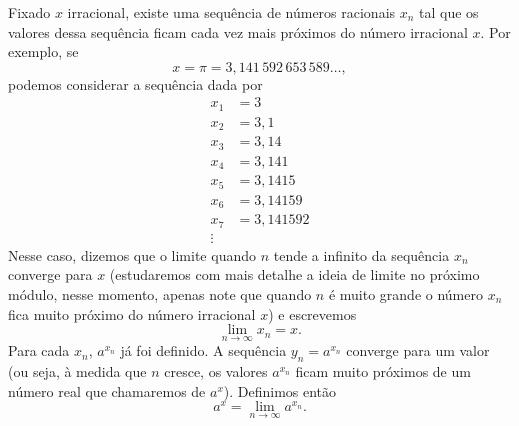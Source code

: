 Fixado $x$ irracional, existe uma sequência de números racionais $x_n$ tal
que os valores dessa sequência ficam cada vez mais próximos do número
irracional $x$. Por exemplo, se
\[
  x
  = \pi
  =3,141\,592\,653\,589\dots,
\]
podemos considerar a sequência dada por
\begin{align*}
  x_1 & = 3          \\
  x_2 & = 3,1        \\
  x_3 & = 3,14       \\
  x_4 & = 3,141      \\
  x_5 & = 3,1415     \\
  x_6 & = 3,14159    \\
  x_7 & = 3,141592   \\
  \vdots
\end{align*}
Nesse caso, dizemos que o limite quando $n$ tende a infinito da sequência
$x_n$ converge para $x$ (estudaremos com mais detalhe a ideia de limite no
próximo módulo, nesse momento, apenas note que quando $n$ é muito grande o
número $x_n$ fica muito próximo do número irracional $x$) e escrevemos
\[
  \lim_{n\to\infty}x_n = x.
\]
Para cada $x_n$, $a^{x_n}$ já foi definido. A sequência $y_n=a^{x_n}$
converge para um valor (ou seja, à medida que $n$ cresce, os valores
$a^{x_n}$ ficam muito próximos de um número real que chamaremos de $a^x$).
Definimos então
\begin{equation}
  a^{x} = \lim_{n\to\infty}a^{x_n}.
\end{equation}

